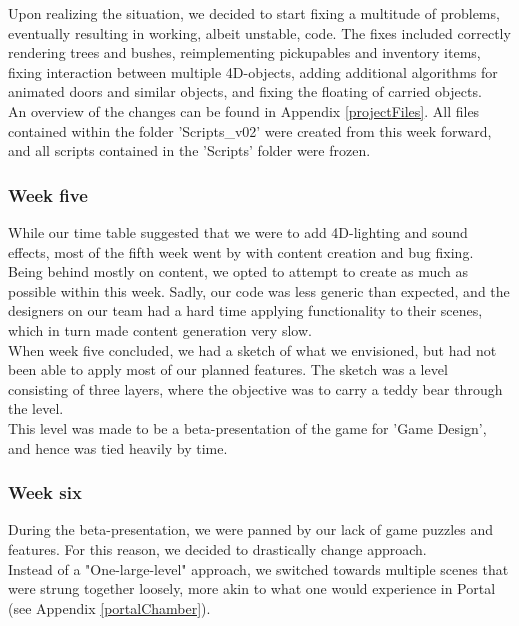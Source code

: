 Upon realizing the situation, we decided to start fixing a multitude of problems, eventually resulting in working, albeit unstable, code. The fixes included correctly rendering trees and bushes, reimplementing pickupables and inventory items, fixing interaction between multiple 4D-objects, adding additional algorithms for animated doors and similar objects, and fixing the floating of carried objects.\\

An overview of the changes can be found in Appendix \ref{projectFiles}. All files contained within the folder 'Scripts\_v02' were created from this week forward, and all scripts contained in the 'Scripts' folder were frozen.

\subsubsection{Week five}
While our time table suggested that we were to add 4D-lighting and sound effects, most of the fifth week went by with content creation and bug fixing.\\

Being behind mostly on content, we opted to attempt to create as much as possible within this week. Sadly, our code was less generic than expected, and the designers on our team had a hard time applying functionality to their scenes, which in turn made content generation very slow.\\

When week five concluded, we had a sketch of what we envisioned, but had not been able to apply most of our planned features. The sketch was a level consisting of three layers, where the objective was to carry a teddy bear through the level.\\

This level was made to be a beta-presentation of the game for 'Game Design', and hence was tied heavily by time.

\subsubsection{Week six}
During the beta-presentation, we were panned by our lack of game puzzles and features. For this reason, we decided to drastically change approach.\\

Instead of a "One-large-level" approach, we switched towards multiple scenes that were strung together loosely, more akin to what one would experience in Portal\cite{portalGame} (see Appendix \ref{portalChamber}).\\

